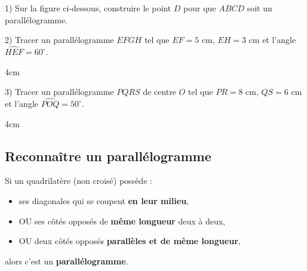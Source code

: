\documentclass[a4paper]{book}
\begin{document}
    
    \begin{exercice}[Constructions]
        1) Sur la figure ci-dessous, construire le point $D$ pour que $ABCD$ soit un parallélogramme.
        \vspace{1cm}
        \begin{center}
        \end{center}
        
        2) Tracer un parallélogramme $EFGH$ tel que $EF = 5\text{ cm}$, $EH = 3\text{ cm}$ et l'angle $\widehat{HEF} = 60^{\circ}$.
        \begin{ZoneReponse}{4cm}
        \end{ZoneReponse}
    
        3) Tracer un parallélogramme $PQRS$ de centre $O$ tel que $PR = 8\text{ cm}$, $QS = 6\text{ cm}$ et l'angle $\widehat{POQ} = 50^{\circ}$.
        \begin{ZoneReponse}{4cm}
        \end{ZoneReponse}
    \end{exercice}


\newpage
\subsection{Reconnaître un parallélogramme}

    \begin{propriete}
    Si un quadrilatère (non croisé) possède :
    \begin{itemize}
        \item ses diagonales qui se coupent \textbf{en leur milieu},
        \item OU ses côtés opposés de \textbf{même longueur} deux à deux,
        \item OU deux côtés opposés \textbf{parallèles et de même longueur},
    \end{itemize}
    alors c'est un \textbf{parallélogramme}.
    \end{propriete}
\end{document}
